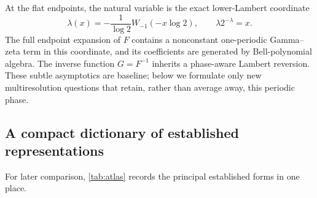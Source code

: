 \documentclass[11pt,oneside]{article}
\theoremstyle{definition}
\theoremstyle{remark}
\newcommand{\1}{\mathbf 1}
\begin{document}
At the flat endpoints, the natural variable is the exact lower-Lambert
coordinate~\cite{corless1996}
\begin{equation}
 \lambda(x)=-\frac{1}{\log2}
 W_{-1}(-x\log2),
 \qquad \lambda2^{-\lambda}=x.                           \label{eq:lower-lambert}
\end{equation}
The full endpoint expansion of $F$ contains a nonconstant one-periodic
Gamma--zeta term in this coordinate, and its coefficients are generated by
Bell-polynomial algebra.  The inverse function $G=F^{-1}$ inherits a
phase-aware Lambert reversion.  These subtle asymptotics are baseline; below
we formulate only new multiresolution questions that retain, rather than
average away, this periodic phase.

\subsection{A compact dictionary of established representations}

For later comparison, \cref{tab:atlas} records the principal established
forms in one place.
\end{document}
